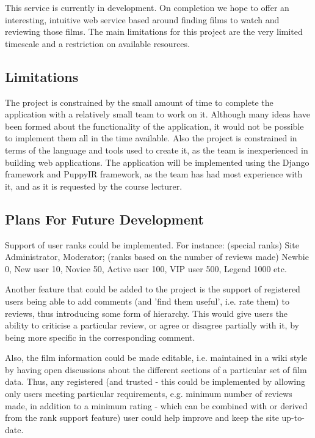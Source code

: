 \documentclass{sig-alt-release2}
\begin{document}
This service is currently in development. On completion we hope to offer an interesting, intuitive web service based around finding films to watch and reviewing those films. The main limitations for this project are the very limited timescale and a restriction on available resources. 
 
\subsection*{Limitations}
 
The project is constrained by the small amount of time to complete the application with a relatively small team to work on it. Although many ideas have been formed about the functionality of the application, it would not be possible to implement them all in the time available. Also the project is constrained in terms of the language and tools used to create it, as the team is inexperienced in building web applications. The application will be implemented using the Django framework and PuppyIR framework, as the team has had most experience with it, and as it is requested by the course lecturer. 
 
\subsection*{Plans For Future Development}
 
Support of user ranks could be implemented. For instance: (special ranks) Site Administrator, Moderator; (ranks based on the number of reviews made) Newbie 0, New user 10, Novice 50, Active user 100, VIP user 500, Legend 1000 etc. 
 
Another feature that could be added to the project is the support of registered users being able to add comments (and 'find them useful', i.e. rate them) to reviews, thus introducing some form of hierarchy. This would give users the ability to criticise a particular review, or agree or disagree partially with it, by being more specific in the corresponding comment. 
 
Also, the film information could be made editable, i.e. maintained in a wiki style by having open discussions about the different sections of a particular set of film data. Thus, any registered (and trusted - this could be implemented by allowing only users meeting particular requirements, e.g. minimum number of reviews made, in addition to a minimum rating - which can be combined with or derived from the rank support feature) user could help improve and keep the site up-to-date. 
 
\end{document}
